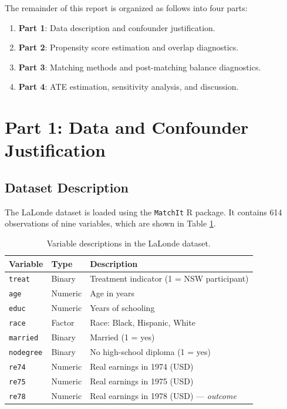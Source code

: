\documentclass[12pt, a4paper]{article}
\begin{document}
The remainder of this report is organized as follows into four parts:
\begin{enumerate}[leftmargin=2em]
  \item \textbf{Part 1}: Data description and confounder justification.
  \item \textbf{Part 2}: Propensity score estimation and overlap diagnostics.
  \item \textbf{Part 3}: Matching methods and post-matching balance diagnostics.
  \item \textbf{Part 4}: ATE estimation, sensitivity analysis, and discussion.
\end{enumerate}

\section{Part 1: Data and Confounder Justification}

\subsection{Dataset Description}

The LaLonde dataset is loaded using the \texttt{MatchIt} R package. It contains 614 observations of nine variables, which are shown in Table \ref{tab:variables}.

\begin{table}[H]
  \centering
  \caption{Variable descriptions in the LaLonde dataset.}
  \label{tab:variables}
  \begin{tabular}{lll}
    \toprule
    \textbf{Variable} & \textbf{Type} & \textbf{Description} \\
    \midrule
    \texttt{treat}   & Binary  & Treatment indicator (1 = NSW participant) \\
    \texttt{age}     & Numeric & Age in years \\
    \texttt{educ}    & Numeric & Years of schooling \\
    \texttt{race}    & Factor  & Race: Black, Hispanic, White \\
    \texttt{married} & Binary  & Married (1 = yes) \\
    \texttt{nodegree}& Binary  & No high-school diploma (1 = yes) \\
    \texttt{re74}    & Numeric & Real earnings in 1974 (USD) \\
    \texttt{re75}    & Numeric & Real earnings in 1975 (USD) \\
    \texttt{re78}    & Numeric & Real earnings in 1978 (USD) — \emph{outcome} \\
    \bottomrule
  \end{tabular}
\end{table}
\end{document}
